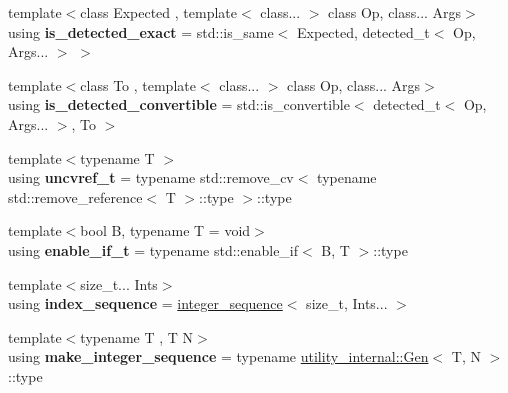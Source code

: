 \begin{DoxyCompactItemize}
\item 
\mbox{\label{namespacenlohmann_1_1detail_a7542b4dbac07817fd4849ecfa4619def}} 
{\footnotesize template$<$class Expected , template$<$ class... $>$ class Op, class... Args$>$ }\\using {\bfseries is\+\_\+detected\+\_\+exact} = std\+::is\+\_\+same$<$ Expected, detected\+\_\+t$<$ Op, Args... $>$ $>$
\item 
\mbox{\label{namespacenlohmann_1_1detail_a5262e531c46e357b33007060f294673b}} 
{\footnotesize template$<$class To , template$<$ class... $>$ class Op, class... Args$>$ }\\using {\bfseries is\+\_\+detected\+\_\+convertible} = std\+::is\+\_\+convertible$<$ detected\+\_\+t$<$ Op, Args... $>$, To $>$
\item 
\mbox{\label{namespacenlohmann_1_1detail_a53a082eedad9f4729fcd8fed552a21f7}} 
{\footnotesize template$<$typename T $>$ }\\using {\bfseries uncvref\+\_\+t} = typename std\+::remove\+\_\+cv$<$ typename std\+::remove\+\_\+reference$<$ T $>$\+::type $>$\+::type
\item 
\mbox{\label{namespacenlohmann_1_1detail_a02bcbc878bee413f25b985ada771aa9c}} 
{\footnotesize template$<$bool B, typename T  = void$>$ }\\using {\bfseries enable\+\_\+if\+\_\+t} = typename std\+::enable\+\_\+if$<$ B, T $>$\+::type
\item 
\mbox{\label{namespacenlohmann_1_1detail_a422430dab7adbe4dfcf125dfcfbeffd0}} 
{\footnotesize template$<$size\+\_\+t... Ints$>$ }\\using {\bfseries index\+\_\+sequence} = \hyperlink{structnlohmann_1_1detail_1_1integer__sequence}{integer\+\_\+sequence}$<$ size\+\_\+t, Ints... $>$
\item 
\mbox{\label{namespacenlohmann_1_1detail_a745268b2c803a873cdbe1fdecb4e88b2}} 
{\footnotesize template$<$typename T , T N$>$ }\\using {\bfseries make\+\_\+integer\+\_\+sequence} = typename \hyperlink{structnlohmann_1_1detail_1_1utility__internal_1_1Gen}{utility\+\_\+internal\+::\+Gen}$<$ T, N $>$\+::type

\end{DoxyCompactItemize}
